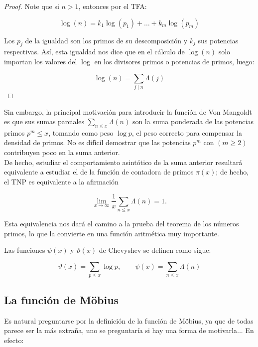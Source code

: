 \begin{proof}

Note que si $n>1$, entonces por el TFA:

$$\log(n)=k_1\log(p_1)+\ldots+k_m\log(p_m)$$

 Los $p_j$ de la igualdad son los primos de su descomposición y $k_j$ sus potencias respectivas. Así, esta igualdad nos dice que en el cálculo de $\log(n)$ solo importan los valores del $\log$ en los divisores primos o potencias de primos, luego:

 $$\log(n)=\sum_{j\mid n}\Lambda(j)$$
\end{proof}

Sin embargo, la principal motivación para introducir la función de Von Mangoldt es que sus sumas parciales $\displaystyle\sum_{n \leq x} \Lambda(n)$ son la suma ponderada de las potencias primos $p^m \leq x$, tomando como peso $\log p$, el peso correcto para compensar la densidad de primos. No es difícil demostrar que las potencias $p^m$ con $(m \geq 2)$ contribuyen poco en la suma anterior.\\

De hecho, estudiar el comportamiento asintótico de la suma anterior resultará equivalente a estudiar el de la función de contadora de primos $\pi(x)$; de hecho, el TNP es equivalente a la afirmación

$$
\lim _{x \rightarrow \infty} \frac{1}{x} \sum_{n \leq x} \Lambda(n)=1 .
$$

Esta equivalencia nos dará el camino a la prueba del teorema de los números primos, lo que la convierte en una función aritmética muy importante.\cite{A.J.Hildebrand}

\begin{definition}

Las funciones $\psi(x)$ y $\vartheta(x)$ de Chevyshev se definen como sigue:

$$\vartheta(x)=\sum_{p\leq x}\log p, \quad \quad \psi(x)=\sum_{n \leq x} \Lambda(n)$$

\end{definition}

\subsection{La función de Möbius}

Es natural preguntarse por la definición de la función de Möbius, ya que de todas parece ser la más extraña, uno se preguntaría si hay una forma de motivarla... En efecto:\\

